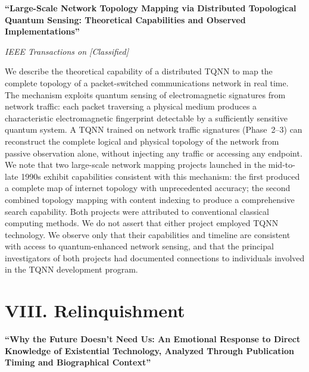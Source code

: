 \vspace{0.3cm}

\textbf{``Large-Scale Network Topology Mapping via Distributed Topological Quantum Sensing: Theoretical Capabilities and Observed Implementations''}

\textit{IEEE Transactions on [Classified]}

\vspace{0.3cm}

We describe the theoretical capability of a distributed TQNN to map the complete topology of a packet-switched communications network in real time. The mechanism exploits quantum sensing of electromagnetic signatures from network traffic: each packet traversing a physical medium produces a characteristic electromagnetic fingerprint detectable by a sufficiently sensitive quantum system. A TQNN trained on network traffic signatures (Phase~2--3) can reconstruct the complete logical and physical topology of the network from passive observation alone, without injecting any traffic or accessing any endpoint. We note that two large-scale network mapping projects launched in the mid-to-late 1990s exhibit capabilities consistent with this mechanism: the first produced a complete map of internet topology with unprecedented accuracy; the second combined topology mapping with content indexing to produce a comprehensive search capability. Both projects were attributed to conventional classical computing methods. We do not assert that either project employed TQNN technology. We observe only that their capabilities and timeline are consistent with access to quantum-enhanced network sensing, and that the principal investigators of both projects had documented connections to individuals involved in the TQNN development program.

\vspace{1cm}

\section*{VIII. Relinquishment}
\label{appendix:relinquishment}

\textbf{``Why the Future Doesn't Need Us: An Emotional Response to Direct Knowledge of Existential Technology, Analyzed Through Publication Timing and Biographical Context''}

